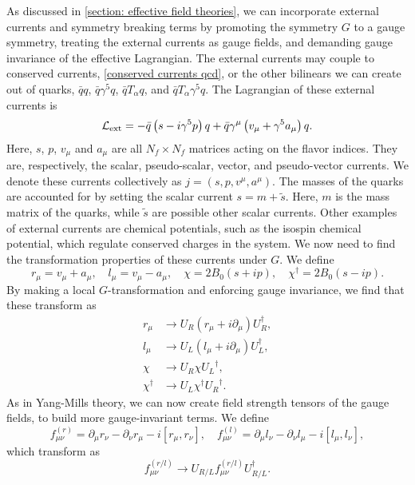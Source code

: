 As discussed in \autoref{section: effective field theories}, we can incorporate external currents and symmetry breaking terms by promoting the symmetry $G$ to a gauge symmetry, treating the external currents as gauge fields, and demanding gauge invariance of the effective Lagrangian.
The external currents may couple to conserved currents, \autoref{conserved currents qcd}, or the other bilinears we can create out of quarks, $\bar q q$, $\bar q\gamma^5 q$, $\bar q T_\alpha q$, and $\bar q T_\alpha \gamma^5 q$.
The Lagrangian of these external currents is
%
\begin{align}
    \mathcal{L}_{\text{ext}}
    = - \bar q \left(s - i \gamma^5 p \right) q
    + \bar q \gamma^\mu  \left(v_\mu + \gamma^5 a_\mu\right)q.
\end{align}
%
Here, $s$, $p$, $v_\mu$ and $a_\mu$ are all $N_f\times N_f$ matrices acting on the flavor indices.
They are, respectively, the scalar, pseudo-scalar, vector, and pseudo-vector currents.
We denote these currents collectively as $j = (s, p, v^\mu, a^\mu)$.
The masses of the quarks are accounted for by setting the scalar current $s = m + \tilde s$.
Here, $m$ is the mass matrix of the quarks, while $\tilde s$ are possible other scalar currents.
Other examples of external currents are chemical potentials, such as the isospin chemical potential, which regulate conserved charges in the system.
We now need to find the transformation properties of these currents under $G$.
We define
%
\begin{equation}
    r_\mu = v_\mu + a_\mu, \quad l_\mu = v_\mu - a_\mu, \quad  
    \chi = 2 B_0 (s +ip), \quad
    \chi^\dagger = 2 B_0(s - ip).
\end{equation}
%
By making a local $G$-transformation and enforcing gauge invariance, we find that these transform as
%
\begin{align}
    r_\mu &\rightarrow U_R (r_\mu + i\partial_\mu) U_R^\dagger, \\
    l_\mu &\rightarrow U_L (l_\mu + i\partial_\mu) U_L^\dagger, \\
    \chi &\rightarrow U_R \chi {U_L}^\dagger, \\
    \chi^\dagger &\rightarrow U_L \chi^\dagger {U_R}^\dagger.
\end{align}
%
As in Yang-Mills theory, we can now create field strength tensors of the gauge fields, to build more gauge-invariant terms.
We define
%
\begin{equation}
    f_{\mu \nu}^{(r)} 
    = 
    \partial_\mu r_\nu - \partial_\nu r_\mu - i[r_\mu, r_\nu], 
    \quad f_{\mu \nu}^{(l)} 
    = \partial_\mu l_\nu - \partial_\nu l_\mu - i[l_\mu, l_\nu],
\end{equation}
%
which transform as 
%
\begin{equation}
    f^{(r/l)}_{\mu\nu} \rightarrow U_{R/L}  f^{(r/l)}_{\mu\nu}  U_{R/L}^\dagger.
\end{equation}

